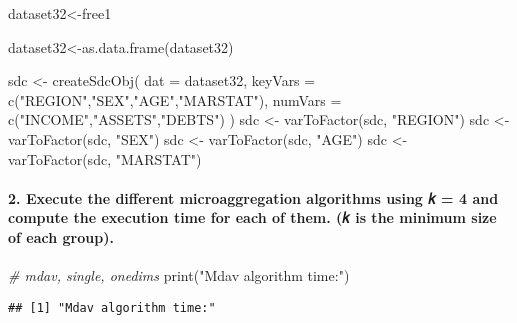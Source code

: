 \documentclass[
]{article}
\newenvironment{Shaded}{\begin{snugshade}}{\end{snugshade}}
\newcommand{\AttributeTok}[1]{\textcolor[rgb]{0.77,0.63,0.00}{#1}}
\newcommand{\CommentTok}[1]{\textcolor[rgb]{0.56,0.35,0.01}{\textit{#1}}}
\newcommand{\FunctionTok}[1]{\textcolor[rgb]{0.00,0.00,0.00}{#1}}
\newcommand{\NormalTok}[1]{#1}
\newcommand{\OtherTok}[1]{\textcolor[rgb]{0.56,0.35,0.01}{#1}}
\newcommand{\StringTok}[1]{\textcolor[rgb]{0.31,0.60,0.02}{#1}}
\begin{document}
\begin{Shaded}
\begin{Highlighting}[]
\NormalTok{dataset32}\OtherTok{\textless{}{-}}\NormalTok{free1}

\NormalTok{dataset32}\OtherTok{\textless{}{-}}\FunctionTok{as.data.frame}\NormalTok{(dataset32)}

\NormalTok{sdc }\OtherTok{\textless{}{-}} \FunctionTok{createSdcObj}\NormalTok{(}
  \AttributeTok{dat =}\NormalTok{ dataset32,}
  \AttributeTok{keyVars =} \FunctionTok{c}\NormalTok{(}\StringTok{"REGION"}\NormalTok{,}\StringTok{"SEX"}\NormalTok{,}\StringTok{"AGE"}\NormalTok{,}\StringTok{"MARSTAT"}\NormalTok{),}
  \AttributeTok{numVars =} \FunctionTok{c}\NormalTok{(}\StringTok{"INCOME"}\NormalTok{,}\StringTok{"ASSETS"}\NormalTok{,}\StringTok{"DEBTS"}\NormalTok{)}
\NormalTok{)}
\NormalTok{sdc }\OtherTok{\textless{}{-}} \FunctionTok{varToFactor}\NormalTok{(sdc, }\StringTok{"REGION"}\NormalTok{)}
\NormalTok{sdc }\OtherTok{\textless{}{-}} \FunctionTok{varToFactor}\NormalTok{(sdc, }\StringTok{"SEX"}\NormalTok{)}
\NormalTok{sdc }\OtherTok{\textless{}{-}} \FunctionTok{varToFactor}\NormalTok{(sdc, }\StringTok{"AGE"}\NormalTok{)}
\NormalTok{sdc }\OtherTok{\textless{}{-}} \FunctionTok{varToFactor}\NormalTok{(sdc, }\StringTok{"MARSTAT"}\NormalTok{)}
\end{Highlighting}
\end{Shaded}

\hypertarget{execute-the-different-microaggregation-algorithms-using-ux1d458-4-and-compute-the-execution-time-for-each-of-them.-ux1d458-is-the-minimum-size-of-each-group.}{%
\paragraph{2. Execute the different microaggregation algorithms using 𝑘
= 4 and compute the execution time for each of them. (𝑘 is the minimum
size of each
group).}\label{execute-the-different-microaggregation-algorithms-using-ux1d458-4-and-compute-the-execution-time-for-each-of-them.-ux1d458-is-the-minimum-size-of-each-group.}}

\begin{Shaded}
\begin{Highlighting}[]
\CommentTok{\# mdav, single, onedims}
\FunctionTok{print}\NormalTok{(}\StringTok{"Mdav algorithm time:"}\NormalTok{)}
\end{Highlighting}
\end{Shaded}

\begin{verbatim}
## [1] "Mdav algorithm time:"
\end{verbatim}
\end{document}
